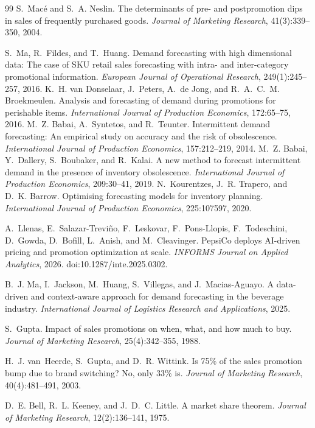 \begin{thebibliography}{99}
 S.~Mac\'e and S.~A. Neslin. The determinants of pre- and postpromotion dips in sales of frequently purchased goods. \emph{Journal of Marketing Research}, 41(3):339--350, 2004.

 S.~Ma, R.~Fildes, and T.~Huang. Demand forecasting with high dimensional data: The case of SKU retail sales forecasting with intra- and inter-category promotional information. \emph{European Journal of Operational Research}, 249(1):245--257, 2016.
 K.~H. van Donselaar, J.~Peters, A.~de Jong, and R.~A.~C.~M. Broekmeulen. Analysis and forecasting of demand during promotions for perishable items. \emph{International Journal of Production Economics}, 172:65--75, 2016.
 M.~Z. Babai, A.~Syntetos, and R.~Teunter. Intermittent demand forecasting: An empirical study on accuracy and the risk of obsolescence. \emph{International Journal of Production Economics}, 157:212--219, 2014.
 M.~Z. Babai, Y.~Dallery, S.~Boubaker, and R.~Kalai. A new method to forecast intermittent demand in the presence of inventory obsolescence. \emph{International Journal of Production Economics}, 209:30--41, 2019.
 N.~Kourentzes, J.~R. Trapero, and D.~K. Barrow. Optimising forecasting models for inventory planning. \emph{International Journal of Production Economics}, 225:107597, 2020.

 A.~Llenas, E.~Salazar-Trevi\~{n}o, F.~Leskovar, F.~Pons-Llopis, F.~Todeschini, D.~Gowda, D.~Bofill, L.~Anish, and M.~Cleavinger. PepsiCo deploys AI-driven pricing and promotion optimization at scale. \emph{INFORMS Journal on Applied Analytics}, 2026. doi:10.1287/inte.2025.0302.

 B.~J. Ma, I.~Jackson, M.~Huang, S.~Villegas, and J.~Macias-Aguayo. A data-driven and context-aware approach for demand forecasting in the beverage industry. \emph{International Journal of Logistics Research and Applications}, 2025.

 S.~Gupta. Impact of sales promotions on when, what, and how much to buy. \emph{Journal of Marketing Research}, 25(4):342--355, 1988.

 H.~J. van~Heerde, S.~Gupta, and D.~R. Wittink. Is 75\% of the sales promotion bump due to brand switching? No, only 33\% is. \emph{Journal of Marketing Research}, 40(4):481--491, 2003.

 D.~E. Bell, R.~L. Keeney, and J.~D.~C. Little. A market share theorem. \emph{Journal of Marketing Research}, 12(2):136--141, 1975.


\end{thebibliography}
